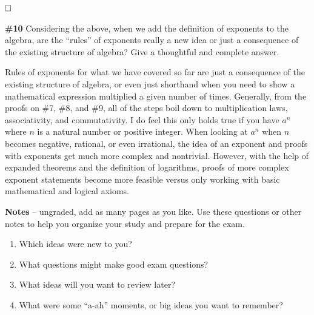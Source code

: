 \documentclass{article}
\newcommand{\sectionbreak}{\clearpage}
\newcommand{\qed}{$\hfill \square$}
\begin{document}
\qed

\sectionbreak
\textbf{\#10} Considering the above, when we add the definition of exponents to the algebra, are the ``rules'' of exponents really a new idea or just a consequence of the existing structure of algebra? Give a thoughtful and complete answer.

\medskip

Rules of exponents for what we have covered so far are just a consequence of the existing structure of algebra, or even just shorthand when you need to show a mathematical expression multiplied a given number of times. Generally, from the proofs on \#7, \#8, and \#9, all of the steps boil down to multiplication laws, associativity, and commutativity. I do feel this only holds true if you have $a^n$ where $n$ is a natural number or positive integer. When looking at $a^n$ when $n$ becomes negative, rational, or even irrational, the idea of an exponent and proofs with exponents get much more complex and nontrivial. However, with the help of expanded theorems and the definition of logarithms, proofs of more complex exponent statements become more feasible versus only working with basic mathematical and logical axioms.

\bigbreak


\sectionbreak
\textbf{Notes} -- ungraded, add as many pages as you like.
\medbreak
Use these questions or other notes to help you organize your study and prepare for the exam.

\begin{enumerate}
    \item Which ideas were new to you?
    \item What questions might make good exam questions?
    \item What ideas will you want to review later?
    \item What were some ``a-ah'' moments, or big ideas you want to remember?
\end{enumerate}

\bigbreak

\end{document}
